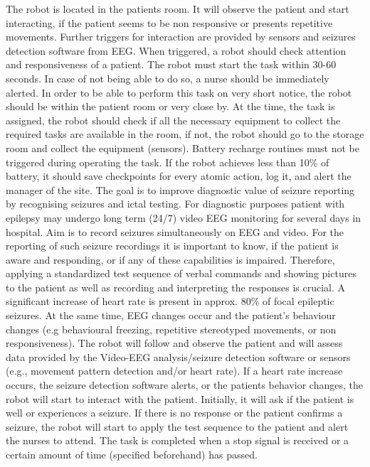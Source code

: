 \documentclass[a4 paper]{article}
\begin{document}
\begin{adjustwidth}{-3cm}{-3cm}
\begin{center}
\begin{tcolorbox}[width=14.5cm]
The robot is located in the patients room. It will observe the patient and start interacting, if the patient seems to be non responsive or presents repetitive movements. Further triggers for interaction are provided by sensors and seizures detection software from EEG. When triggered, a robot should check attention and responsiveness of a patient. The robot must start the task within 30-60 seconds. In case of not being able to do so, a nurse should be immediately alerted. In order to be able to perform this task on very short notice, the robot should be within the patient room or very close by. At the time, the task is assigned, the robot should check if all the necessary equipment to collect the required tasks are available in the room, if not, the robot should go to the storage room and collect the equipment (sensors). Battery recharge routines must not be triggered during operating the task. If the robot achieves less than 10\% of battery, it should save checkpoints for every atomic action, log it, and alert the manager of the site. The goal is to improve diagnostic value of seizure reporting by recognising seizures and ictal testing. For diagnostic purposes patient with epilepsy may undergo long term (24/7) video EEG monitoring for several days in hospital. Aim is to record seizures simultaneously on EEG and video. For the reporting of such seizure recordings it is important to know, if the patient is aware and responding, or if any of these capabilities is impaired. Therefore, applying a standardized test sequence of verbal commands and showing pictures to the patient as well as recording and interpreting the responses is crucial. A significant increase of heart rate is present in approx. 80\% of focal epileptic seizures. At the same time, EEG changes occur and the patient's behaviour changes (e.g behavioural freezing, repetitive stereotyped movements, or non responsiveness). The robot will follow and observe the patient and will assess data provided by the Video-EEG analysis/seizure detection software or sensors (e.g., movement pattern detection and/or heart rate). If a heart rate increase occurs, the seizure detection software alerts, or the patients behavior changes, the robot will start to interact with the patient. Initially, it will ask if the patient is well or experiences a seizure. If there is no response or the patient confirms a seizure, the robot will start to apply the test sequence to the patient and alert the nurses to attend. The task is completed when a stop signal is received or a certain amount of time (specified beforehand) has passed. 
\end{tcolorbox}
\end{center}
\end{adjustwidth}
\end{document}

